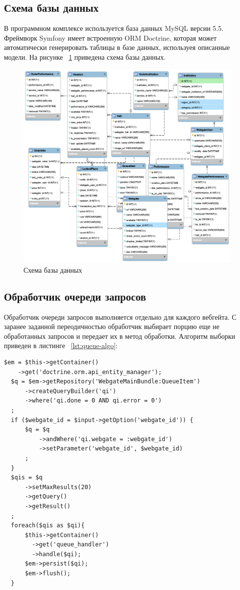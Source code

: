 \subsection{Схема базы данных}

В программном комплексе используется база данных MySQL версии 5.5. Фреймворк Symfony имеет встроенную ORM Doctrine, которая может автоматически генерировать таблицы в базе данных, используея описанные модели. На рисунке ~\ref{fig:db-schema} приведена схема базы данных.

\begin{figure}[H]
  	\centering
 	\includegraphics[width=1\textwidth]{images/db-schema.png}
  	\caption{Схема базы данных}
    \label{fig:db-schema}
\end{figure}

\subsection{Обработчик очереди запросов}

Обработчик очереди запросов выполняется отдельно для каждого вебгейта. С заранее заданной переодичностью обработчик выбирает порцию еще не обработанных запросов и передает их в метод обработки. Алгоритм выборки приведен в листинге ~\ref{lst:queue-algo}:

\begin{lstlisting}[caption={Алгоритм выборки запросов из очереди}, label=lst:queue-algo]
  $em = $this->getContainer()
    ->get('doctrine.orm.api_entity_manager');
  $q = $em->getRepository('WebgateMainBundle:QueueItem')
      ->createQueryBuilder('qi')
      ->where('qi.done = 0 AND qi.error = 0')
  ;
  if ($webgate_id = $input->getOption('webgate_id')) {
      $q = $q
          ->andWhere('qi.webgate = :webgate_id')
          ->setParameter('webgate_id', $webgate_id)
      ;
  }
  $qis = $q
      ->setMaxResults(20)
      ->getQuery()
      ->getResult()
  ;
  foreach($qis as $qi){
      $this->getContainer()
        ->get('queue_handler')
        ->handle($qi);
      $em->persist($qi);
      $em->flush();
  }
\end{lstlisting}


